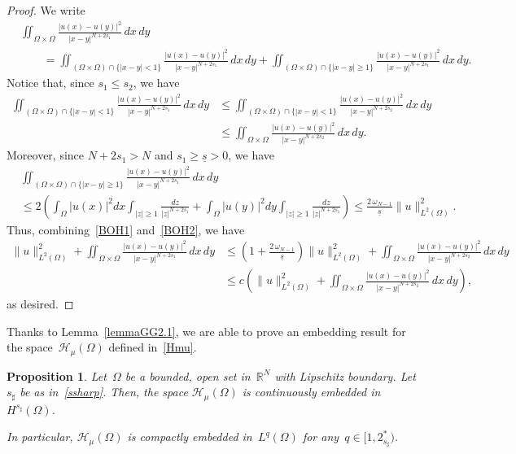\documentclass[12pt,a4paper,intlimits,sumlimits]{amsart}
\def \R {\mathbb{R}}
\theoremstyle{definition}
\theoremstyle{plain}
\newtheorem{proposition}[definition]{Proposition}
\numberwithin{equation}{section}
\renewcommand{\le}{\leqslant}
\renewcommand{\geq}{\geqslant}
\renewcommand{\ge}{\geqslant}
\begin{document}
\begin{proof}
We write
\[
\begin{split}
&\iint_{\Omega\times \Omega}\frac{|u(x)-u(y)|^2}{|x-y|^{N+2s_1}}\,dx\,dy\\
&\qquad = \iint_{(\Omega\times\Omega)\cap\{|x-y|< 1\}}\frac{|u(x)-u(y)|^2}{|x-y|^{N+2s_1}}\,dx\,dy + \iint_{(\Omega\times\Omega)\cap\{|x-y|\geq 1\}}\frac{|u(x)-u(y)|^2}{|x-y|^{N+2s_1}}\,dx\,dy.
\end{split}
\]
Notice that, since $s_1 \le s_2$, we have
\begin{equation}\label{BOH1}
\begin{split}
\iint_{(\Omega\times\Omega)\cap\{|x-y|< 1\}}\frac{|u(x)-u(y)|^2}{|x-y|^{N+2s_1}}\,dx\,dy &\le \iint_{(\Omega\times\Omega)\cap\{|x-y|< 1\}}\frac{|u(x)-u(y)|^2}{|x-y|^{N+2s_2}}\,dx\,dy\\
&\le \iint_{\Omega\times\Omega}\frac{|u(x)-u(y)|^2}{|x-y|^{N+2s_2}}\,dx\,dy.
\end{split}
\end{equation}
Moreover, since $N+2s_1>N$ and $s_1\ge \underline{s}>0$, we have
\begin{equation}\label{BOH2}
\begin{split}
&\iint_{(\Omega\times\Omega)\cap\{|x-y|\ge 1\}}\frac{|u(x)-u(y)|^2}{|x-y|^{N+2s_1}}\,dx\,dy\\
& \le 2\left(\int_{\Omega}|u(x)|^2 dx \int_{|z|\ge 1}\frac{dz}{|z|^{N+2s_1}} + \int_{\Omega}|u(y)|^2 dy \int_{|z|\ge 1}\frac{dz}{|z|^{N+2s_1}}\right)\le \frac{2\, \omega_{N-1}}{\underline s}\|u\|^2_{L^2(\Omega)}.
\end{split}
\end{equation}
Thus,  combining~\eqref{BOH1} and~\eqref{BOH2}, we have
\[
\begin{split}
\|u\|_{L^2(\Omega)}^2 +\iint_{\Omega\times \Omega}\frac{|u(x)-u(y)|^2}{|x-y|^{N+2s_1}}\,dx\,dy &\le \left(1+\frac{2\, \omega_{N-1}}{\underline s} \right)\|u\|^2_{L^2(\Omega)} + \iint_{\Omega\times\Omega}\frac{|u(x)-u(y)|^2}{|x-y|^{N+2s_2}}\,dx\,dy\\
&\le c\left(\|u\|_{L^2(\Omega)}^2 +\iint_{\Omega\times \Omega}\frac{|u(x)-u(y)|^2}{|x-y|^{N+2s_2}}\,dx\,dy\right),
\end{split}
\]
as desired.
\end{proof}

Thanks to Lemma~\ref{lemmaGG2.1}, we are able to prove an embedding result for the space~$\mathcal H_\mu(\Omega)$ defined in~\eqref{Hmu}.

\begin{proposition}\label{propcompactembedding}
Let~$\Omega$ be a bounded, open set in~$\R^N$ with Lipschitz boundary. 
Let $s_\sharp$ be as in~\eqref{ssharp}. Then, the space $\mathcal{H}_\mu(\Omega)$ is continuously embedded in~$H^{s_\sharp}(\Omega)$.

In particular, $\mathcal{H}_\mu(\Omega)$ is compactly embedded in~$L^q(\Omega)$ for any~$q\in [1,2^*_{s_\sharp})$.
\end{proposition}
\end{document}
